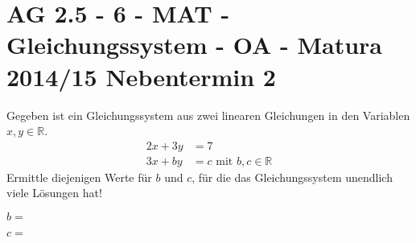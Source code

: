 \section{AG 2.5 - 6 - MAT - Gleichungssystem - OA - Matura 2014/15 Nebentermin 2}

\begin{beispiel}[AG 2.5]{1} %
				Gegeben ist ein Gleichungssystem aus zwei linearen Gleichungen in den Variablen $x,y\in\mathbb{R}$.
			\begin{align*} 2x+3y &= 7\\ 3x+by &= c\text{ mit }b,c\in\mathbb{R} \end{align*}
			Ermittle diejenigen Werte für $b$ und $c$, für die das Gleichungssystem unendlich viele Lösungen hat!
			\leer
			
			$b=$ 
			\leer
			
			$c=$ 
\end{beispiel}